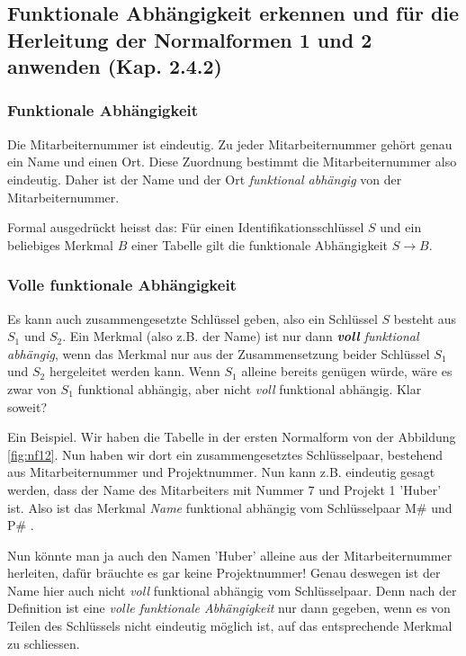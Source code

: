 \subsection{Funktionale Abhängigkeit erkennen und für die Herleitung der Normalformen 1 und 2 anwenden (Kap. 2.4.2)}
\subsubsection{Funktionale Abhängigkeit}
Die Mitarbeiternummer ist eindeutig. Zu jeder Mitarbeiternummer gehört genau ein Name und einen Ort. Diese Zuordnung bestimmt die Mitarbeiternummer also eindeutig. Daher ist der Name und der Ort \emph{funktional abhängig} von der Mitarbeiternummer.

Formal ausgedrückt heisst das: Für einen Identifikationsschlüssel \(S\) und ein beliebiges Merkmal \(B\) einer Tabelle gilt die funktionale Abhängigkeit \(S \rightarrow B\).
\subsubsection{Volle funktionale Abhängigkeit}
Es kann auch zusammengesetzte Schlüssel geben, also ein Schlüssel \(S\) besteht aus \(S_{1}\) und \(S_{2}\). Ein Merkmal (also z.B. der Name) ist nur dann \emph{\textbf{voll} funktional  abhängig}, wenn das Merkmal nur aus der Zusammensetzung beider Schlüssel \(S_{1}\) und \(S_{2}\) hergeleitet werden kann. Wenn \(S_{1}\) alleine bereits genügen würde, wäre es zwar von \(S_{1}\) funktional abhängig, aber nicht \emph{voll} funktional abhängig. Klar soweit?

Ein Beispiel. Wir haben die Tabelle in der ersten Normalform von der Abbildung \ref{fig:nf12}. Nun haben wir dort ein zusammengesetztes Schlüsselpaar, bestehend aus Mitarbeiternummer und Projektnummer. Nun kann z.B. eindeutig gesagt werden, dass der Name des Mitarbeiters mit Nummer 7 und Projekt 1 'Huber' ist. Also ist das Merkmal \emph{Name} funktional abhängig vom Schlüsselpaar M\# und P\# .

Nun könnte man ja auch den Namen 'Huber' alleine aus der Mitarbeiternummer herleiten, dafür bräuchte es gar keine Projektnummer! Genau deswegen ist der Name hier auch nicht \emph{voll} funktional abhängig vom Schlüsselpaar. Denn nach der Definition ist eine \emph{volle funktionale Abhängigkeit} nur dann gegeben, wenn es von Teilen des Schlüssels nicht eindeutig möglich ist, auf das entsprechende Merkmal zu schliessen.

